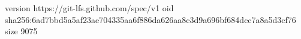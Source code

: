 version https://git-lfs.github.com/spec/v1
oid sha256:6ad7bbd5a5af23ae704335aa6f886da626aa8c3d9a696bf684dcc7a8a5d3cf76
size 9075
